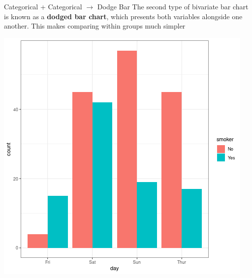 \documentclass{beamer}
\begin{document}
\begin{frame}{Categorical + Categorical $\rightarrow$ Dodge Bar}
The second type of bivariate bar chart is known as a \textbf{dodged bar chart}, which presents both variables alongside one another. This makes comparing within groups much simpler

\begin{center}
\includegraphics[scale=0.35]{img/bar_dodge.png}
\end{center}

\end{frame}
\end{document}
